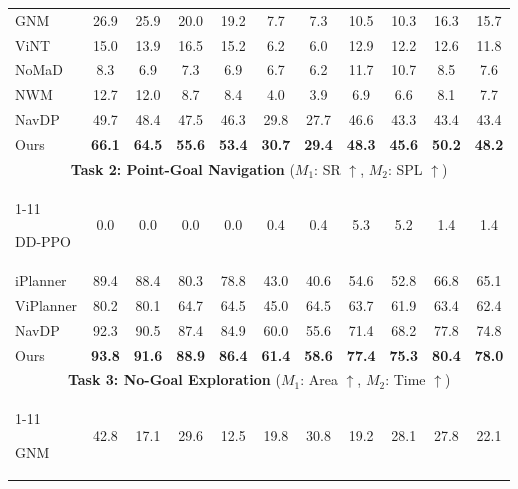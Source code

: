 \documentclass{article}
\begin{document}
\begin{table}[t]
\begin{tabular*}{\textwidth}{@{\extracolsep{\fill}}l cc cc cc cc cc}
GNM
& 26.9 & 25.9
& 20.0 & 19.2
& 7.7 & 7.3
& 10.5 & 10.3
& 16.3 & 15.7 \\

ViNT
& 15.0 & 13.9
& 16.5 & 15.2
& 6.2 & 6.0
& 12.9 & 12.2
& 12.6 & 11.8 \\

NoMaD
& 8.3 & 6.9
& 7.3 & 6.9
& 6.7 & 6.2
& 11.7 & 10.7
& 8.5 & 7.6 \\

NWM
& 12.7 & 12.0
& 8.7 & 8.4
& 4.0 & 3.9
& 6.9 & 6.6
& 8.1 & 7.7 \\

NavDP
& 49.7 & 48.4
& 47.5 & 46.3
& 29.8 & 27.7
& 46.6 & 43.3
& 43.4 & 43.4 \\

Ours
& \textbf{66.1} & \textbf{64.5}
& \textbf{55.6} & \textbf{53.4}
& \textbf{30.7} & \textbf{29.4}
& \textbf{48.3} & \textbf{45.6}
& \textbf{50.2} & \textbf{48.2} \\

\midrule

\multicolumn{11}{c}{\textbf{Task 2: Point-Goal Navigation} ($M_1$: SR $\uparrow$, $M_2$: SPL $\uparrow$)} \\
\cmidrule(lr){1-11}

DD-PPO
& 0.0 & 0.0
& 0.0 & 0.0
& 0.4 & 0.4
& 5.3 & 5.2
& 1.4 & 1.4 \\

iPlanner
& 89.4 & 88.4
& 80.3 & 78.8
& 43.0 & 40.6
& 54.6 & 52.8
& 66.8 & 65.1 \\

ViPlanner
& 80.2 & 80.1
& 64.7 & 64.5
& 45.0 & 64.5
& 63.7 & 61.9
& 63.4 & 62.4 \\

NavDP
& 92.3 & 90.5
& 87.4 & 84.9
& 60.0 & 55.6
& 71.4 & 68.2
& 77.8 & 74.8 \\

Ours
& \textbf{93.8} & \textbf{91.6}
& \textbf{88.9} & \textbf{86.4}
& \textbf{61.4} & \textbf{58.6}
& \textbf{77.4} & \textbf{75.3}
& \textbf{80.4} & \textbf{78.0} \\

\midrule

\multicolumn{11}{c}{\textbf{Task 3: No-Goal Exploration} ($M_1$: Area $\uparrow$, $M_2$: Time $\uparrow$)} \\
\cmidrule(lr){1-11}

GNM
& 42.8 & 17.1
& 29.6 & 12.5
& 19.8 & 30.8
& 19.2 & 28.1
& 27.8 & 22.1 \\


\end{tabular*}
\end{table}
\end{document}
